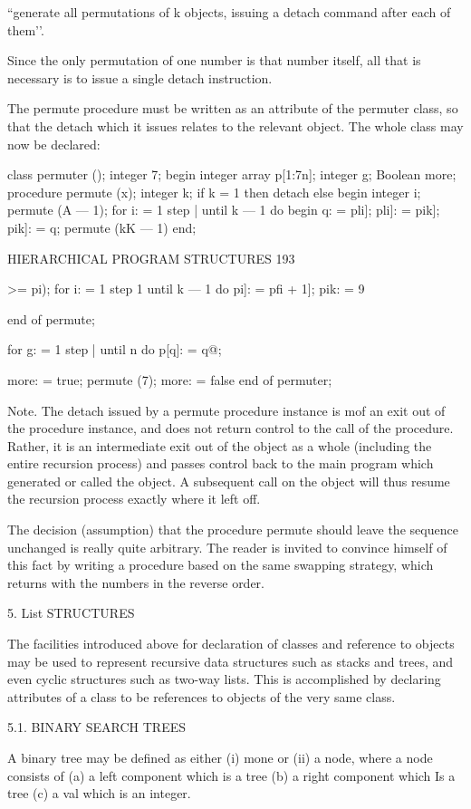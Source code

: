 {{{“generate all permutations of k objects, issuing a detach command after each of them’’.

Since the only permutation of one number is that number itself, all that is necessary is to issue a single detach instruction.

The permute procedure must be written as an attribute of the permuter class, so that the detach which it issues relates to the relevant object. The whole class may now be declared:

class permuter (); integer 7; begin integer array p[1:7n]; integer g; Boolean more; procedure permute (x); integer k; if k = 1 then detach else begin integer i; permute (A — 1); for i: = 1 step | until k — 1 do begin q: = pli]; pli]: = pik]; pik]: = q; permute (kK — 1) end;

HIERARCHICAL PROGRAM STRUCTURES 193

>= pi); for i: = 1 step 1 until k — 1 do p{i]: = pfi + 1]; pik}: = 9

end of permute;

for g: = 1 step | until n do p[q]: = q@;

more: = true; permute (7); more: = false end of permuter;

Note. The detach issued by a permute procedure instance is mof an exit out of the procedure instance, and does not return control to the call of the procedure. Rather, it is an intermediate exit out of the object as a whole (including the entire recursion process) and passes control back to the main program which generated or called the object. A subsequent call on the object will thus resume the recursion process exactly where it left off.

The decision (assumption) that the procedure permute should leave the sequence unchanged is really quite arbitrary. The reader is invited to convince himself of this fact by writing a procedure based on the same swapping strategy, which returns with the numbers in the reverse order.

5. List STRUCTURES

The facilities introduced above for declaration of classes and reference to objects may be used to represent recursive data structures such as stacks and trees, and even cyclic structures such as two-way lists. This is accomplished by declaring attributes of a class to be references to objects of the very same class.

5.1. BINARY SEARCH TREES

A binary tree may be defined as either (i) mone or (ii) a node, where a node consists of (a) a left component which is a tree (b) a right component which Is a tree (c) a val which is an integer.

}}}
